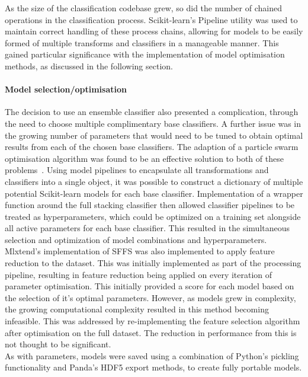 \documentclass[titlepage, 12pt]{scrartcl} \usepackage{enumitem}
\begin{document}
As the size of the classification codebase grew, so did the number of chained
operations in the classification process. Scikit-learn's Pipeline utility was
used to maintain correct handling of these process chains, allowing for models
to be easily formed of multiple transforms and classifiers in a manageable
manner. This gained particular significance with the implementation of model
optimisation methods, as discussed in the following section.

\paragraph{Model selection/optimisation}\label{ModOp}
The decision to use an ensemble classifier also presented a complication,
through the need to choose multiple complimentary base classifiers. A further
issue was in the growing number of parameters that would need to be tuned to
obtain optimal results from each of the chosen base classifiers. The adaption
of a particle swarm optimisation algorithm was found to be an effective
solution to both of these problems~\parencite{Claesen2014}. Using model
pipelines to encapsulate all transformations and classifiers into a single
object, it was possible to construct a dictionary of multiple potential
Scikit-learn models for each base classifier.  Implementation of a wrapper
function around the full stacking classifier then allowed classifier pipelines
to be treated as hyperparameters, which could be optimized on a training set
alongside all active parameters for each base classifier. This resulted in the
simultaneous selection and optimization of model combinations and
hyperparameters.\\

Mlxtend's implementation of SFFS was also implemented to apply feature reduction to
the dataset. This was initially implemented as part of the processing pipeline,
resulting in feature reduction being applied on every iteration of parameter
optimisation. This initially provided a score for each model based on the
selection of it's optimal parameters. However, as models grew in complexity,
the growing computational complexity resulted in this method becoming infeasible.
This was addressed by re-implementing the feature selection algorithm after
optimisation on the full dataset. The reduction in performance from this is not
thought to be significant.\\

As with parameters, models were saved using a combination of Python's pickling
functionality and Panda's HDF5 export methods, to create fully portable models.
\end{document}
